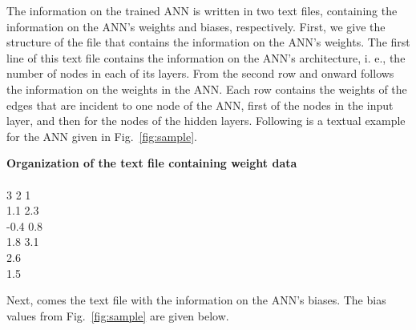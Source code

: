 \documentclass[11pt,titlepage,dvipdfmx,twoside]{book}
\begin{document}

The information on the trained ANN is written in two text files, containing the information
on the ANN's weights and biases, respectively.
First, we give the structure of the file that contains the information on the ANN's weights.
The first line of this text file contains the information on the ANN's architecture, i. e., 
the number of nodes in each of its layers.
From the second row and onward
follows the information on the 
weights in the ANN.
Each row contains the weights of the edges that are incident to one node of the ANN,
first of the nodes in the input layer, and then for the nodes of the hidden layers.
Following is a textual example for the ANN given in Fig.~\ref{fig:sample}.

\bigskip

\begin{oframed}
{\bf Organization of the text file containing weight data}\\\\
3 2 1\\
1.1 2.3\\
-0.4 0.8\\
1.8 3.1\\
2.6\\
1.5\\
\end{oframed}

\bigskip


Next, comes the text file with the information on the ANN's biases.
The bias values from Fig.~\ref{fig:sample} are given below.
\end{document}
